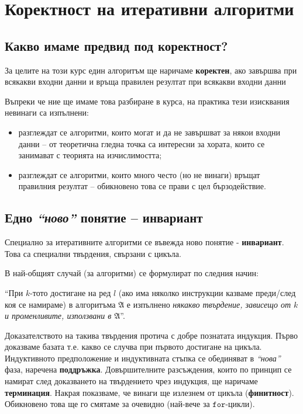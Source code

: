 \chapter{Коректност на итеративни алгоритми}

\section{Какво имаме предвид под коректност?}

За целите на този курс един алгоритъм ще наричаме \textbf{коректен}, ако завършва при всякакви входни данни и връща правилен резултат при всякакви входни данни

\begin{remark}
    Въпреки че ние ще имаме това разбиране в курса, на практика тези изисквания невинаги са изпълнени:
    \begin{itemize}
        \item разглеждат се алгоритми, които могат и да не завършват за някои входни данни -- от теоретична гледна точка са интересни за хората, които се занимават с теорията на изчислимостта;
        \item разглеждат се алгоритми, които много често (но не винаги) връщат правилния резултат -- обикновено това се прави с цел бързодействие.
    \end{itemize}
\end{remark}

\section{Едно \textit{``ново''} понятие -- инвариант}

Специално за итеративните алгоритми се въвежда ново понятие - \textbf{инвариант}.
Това са специални твърдения, свързани с цикъла.

В най-общият случай (за алгоритми) се формулират по следния начин:
\begin{center}
    ``При $k$-тото достигане на ред $l$ (ако има няколко инструкции казваме преди/след коя се намираме) в алгоритъма $\mathfrak{A}$ е изпълнено \textit{някакво твърдение, зависещо от $k$ и променливите, използвани в $\mathfrak{A}$}''.
\end{center}
Доказателството на такива твърдения протича с добре познатата индукция.
Първо доказваме базата т.е. какво се случва при първото достигане на цикъла.
Индуктивното предположение и индуктивната стъпка се обединяват в \textit{``нова''} фаза, наречена \textbf{поддръжка}.
Довършителните разсъждения, които по принцип се намират след доказването на твърдението чрез индукция, ще наричаме \textbf{терминация}.
Накрая показваме, че винаги ще излезнем от цикъла (\textbf{финитност}).
Обикновено това ще го смятаме за очевидно (най-вече за $\mathtt{for}$-цикли).

